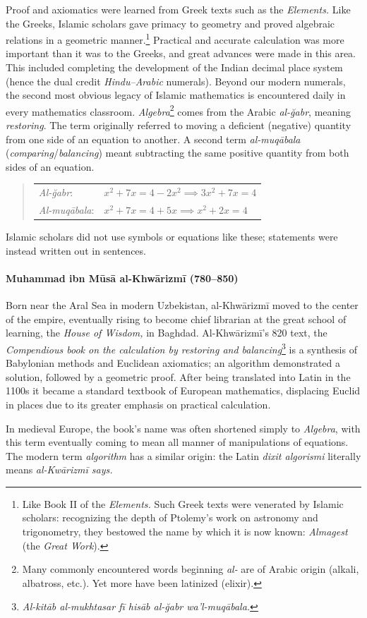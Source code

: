 Proof and axiomatics were learned from Greek texts such as the \emph{Elements.} Like the Greeks, Islamic scholars gave primacy to geometry and proved algebraic relations in a geometric manner.\footnote{%
	Like Book II of the \emph{Elements.} Such Greek texts were venerated by Islamic scholars: recognizing the depth of Ptolemy's work on astronomy and trigonometry, they bestowed the name by which it is now known: \emph{Almagest} (the \emph{Great Work}).%
}
Practical and accurate calculation was more important than it was to the Greeks, and great advances were made in this area. This included completing the development of the Indian decimal place system (hence the dual credit \emph{Hindu--Arabic} numerals).\smallbreak
Beyond our modern numerals, the second most obvious legacy of Islamic mathematics is encountered daily in every mathematics classroom. \emph{Algebra}\footnote{%
	Many commonly encountered words beginning \emph{al-} are of Arabic origin (alkali, albatross, etc.). Yet more have been latinized (elixir).%
}
comes from the Arabic \emph{al-ğabr}, meaning \emph{restoring}. The term originally referred to moving a deficient (negative) quantity from one side of an equation to another. A second term \emph{al-muqābala} (\emph{comparing}/\emph{balancing}) meant subtracting the same positive quantity from both sides of an equation.
\begin{quote}
	\begin{tabular}{l@{\quad}l}
		\emph{Al-ğabr}:&$x^2+7x=4-2x^2\implies 3x^2+7x=4$\\[4pt]
		\emph{Al-muqābala}:&$x^2+7x=4+5x\implies x^2+2x=4$
	\end{tabular}
\end{quote}
Islamic scholars did not use symbols or equations like these; statements were instead written out in sentences.


\paragraph{Muhammad ibn Mūsā al-Khwārizmī (780--850)}
	
Born near the Aral Sea in modern Uzbekistan, al-Khwārizmī moved to the center of the empire, eventually rising to become chief librarian at the great school of learning, the \emph{House of Wisdom,} in Baghdad.\smallbreak
Al-Khwārizmī's 820 text, the \emph{Compendious book on the calculation by restoring and balancing}\footnote{\emph{Al-kitāb al-mukhtasar fī hisāb al-ğabr wa’l-muqābala.}} is a synthesis of Babylonian methods and Euclidean axiomatics; an algorithm demonstrated a solution, followed by a geometric proof. After being translated into Latin in the 1100s it became a standard textbook of European mathematics, displacing Euclid in places due to its greater emphasis on practical calculation.\par
In medieval Europe, the book's name was often shortened simply to \emph{Algebra}, with this term eventually coming to mean all manner of manipulations of equations. The modern term \emph{algorithm} has a similar origin: the Latin \emph{dixit algorismi} literally means \emph{al-Kwārizmī says.}


